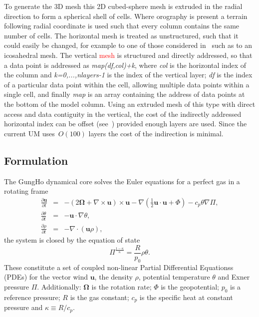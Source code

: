 \documentclass[times]{elsarticle}
\begin{document}
To generate the 3D mesh this 2D cubed-sphere mesh is extruded in the radial 
direction to form a spherical shell of cells. Where orography is present a terrain
following radial coordinate is used such that every column contains the
same number of cells. The horizontal mesh is treated as unstructured,
such that it could easily be changed, for example to one of those considered 
in~\cite{staniforth2012} such as to an icosahedral mesh.
The vertical \textcolor{red}{mesh} is structured and directly addressed, so that
a data point is addressed as \textit{map(df,col)+k}, where \textit{col}
is the horizontal index of the column and \textit{k=0,...,nlayers-1} is
the index of the vertical layer; \textit{df} is the index of a particular
data point within the cell, allowing multiple data points within a single cell, and 
finally \textit{map} is an array containing the address of data points at 
the bottom of the model column.
Using an extruded mesh of this type with direct access and data contiguity
in the vertical, the cost of the indirectly addressed horizontal index can 
be offset (see~\cite{gmd-9-3803-2016}) provided enough layers are used. 
Since the current UM uses~$O(100)$ layers the cost of the indirection is minimal.
%

\subsection{Formulation\label{sec:sub:formulation}}
The GungHo dynamical core solves the Euler equations for a perfect gas in a 
rotating frame
%
\begin{eqnarray}
\frac{\partial\mathbf{u}}{\partial t} & = & -\left(2\bm{\Omega}+\nabla\times\mathbf{u}\right)\times\mathbf{u} - \nabla\left(\frac{1}{2}\mathbf{u}\cdot\mathbf{u} + \Phi\right) - c_p\theta\nabla\Pi,\label{eq:momentum}\\
\frac{\partial\theta}{\partial t} & = & - \mathbf{u}\cdot\nabla\theta,\label{eq:energy}\\
\frac{\partial\rho}{\partial t} & = & - \nabla\cdot\left(\mathbf{u}\rho\right)\label{eq:continuity},
\end{eqnarray}
%
the system is closed by the equation of state
%
\begin{equation}
\Pi^{\frac{1-\kappa}{\kappa}} = \frac{R}{p_0}\rho\theta.\label{eq:eos}
\end{equation}
%
These constitute a set of coupled non-linear Partial Differential
Equationss (PDEs) for the vector wind $\mathbf{u}$, 
the density $\rho$, potential temperature $\theta$ and Exner pressure $\Pi$. 
Additionally: $\bm{\Omega}$ is the rotation rate; $\Phi$ is the geopotential; 
$p_0$ is a reference pressure; $R$ is the gas constant; $c_p$ is the specific 
heat at constant pressure and $\kappa\equiv R/c_p$.
\end{document}
